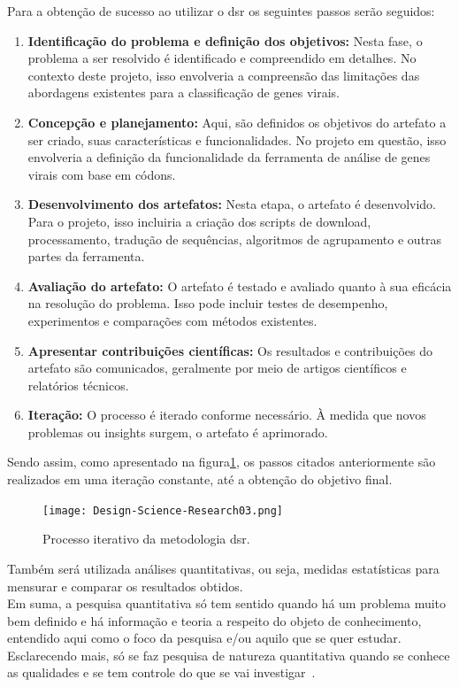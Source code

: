 Para a obtenção de sucesso ao utilizar o \gls{dsr} os seguintes passos serão seguidos:
\begin{enumerate}
  \item \textbf{Identificação do problema e definição dos objetivos:} Nesta fase, o problema a ser resolvido é identificado e compreendido em detalhes. No contexto deste projeto, isso envolveria a compreensão das limitações das abordagens existentes para a classificação de genes virais.
  \item \textbf{Concepção e planejamento:} Aqui, são definidos os objetivos do artefato a ser criado, suas características e funcionalidades. No projeto em questão, isso envolveria a definição da funcionalidade da ferramenta de análise de genes virais com base em códons.
  \item \textbf{Desenvolvimento dos artefatos:} Nesta etapa, o artefato é desenvolvido. Para o projeto, isso incluiria a criação dos scripts de download, processamento, tradução de sequências, algoritmos de agrupamento e outras partes da ferramenta.
  \item \textbf{Avaliação do artefato:} O artefato é testado e avaliado quanto à sua eficácia na resolução do problema. Isso pode incluir testes de desempenho, experimentos e comparações com métodos existentes.
  \item \textbf{Apresentar contribuições científicas:} Os resultados e contribuições do artefato são comunicados, geralmente por meio de artigos científicos e relatórios técnicos.
  \item \textbf{Iteração:} O processo é iterado conforme necessário. À medida que novos problemas ou insights surgem, o artefato é aprimorado.
\end{enumerate}

Sendo assim, como apresentado na figura\ref{fig:processoDSR}, os passos citados anteriormente são realizados em uma iteração constante, até a obtenção do objetivo final.

\begin{figure}[htb]
  \centering
  \caption{Processo iterativo da metodologia \gls{dsr}.}
  \texttt{[image: Design-Science-Research03.png]}
  ~\label{fig:processoDSR}
\end{figure}

Também será utilizada análises quantitativas, ou seja, medidas estatísticas para mensurar e comparar os resultados obtidos.\\
Em suma, a pesquisa quantitativa só tem sentido quando há um problema muito bem definido e há informação e teoria a respeito do objeto de conhecimento, entendido aqui como o foco da pesquisa e/ou aquilo que se quer estudar. Esclarecendo mais, só se faz pesquisa de natureza quantitativa quando se conhece as qualidades e se tem controle do que se vai investigar~\cite{da_silva_pesquisa_2014}.

